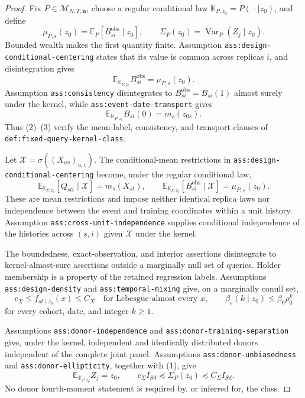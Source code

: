 \documentclass{article}
\begin{document}
\begin{proof}
Fix \(P\in\mathcal M_{N,T,\mathbf n}\), choose a regular conditional law
\(\mathbb K_{P,z_0}=P(\,\cdot\mid z_0)\), and define
\[
 \mu_{P,s}(z_0)=\mathbb E_P[B_{si}^{\mathrm{obs}}\mid z_0],
 \qquad
 \Sigma_P(z_0)=\operatorname{Var}_P(Z_j\mid z_0).           \tag{1}
\]
Bounded wealth makes the first quantity finite.  Assumption
\texttt{ass:design-conditional-centering} states that its value is common across replicas \(i\), and disintegration gives
\[
 \mathbb E_{\mathbb K_{P,z_0}}B_{si}^{\mathrm{obs}}
 =\mu_{P,s}(z_0).                                           \tag{2}
\]
Assumption \texttt{ass:consistency} disintegrates to
\(B_{si}^{\mathrm{obs}}=B_{si}(1)\) almost surely under the kernel, while \texttt{ass:event-date-transport} gives
\[
 \mathbb E_{\mathbb K_{P,z_0}}B_{si}(0)=m_s(z_{0s}).       \tag{3}
\]
Thus (2)--(3) verify the mean-label, consistency, and transport clauses of \texttt{def:fixed-query-kernel-class}.

Let \(\mathcal X=\sigma((X_{uv})_{u,v})\).  The conditional-mean restrictions in \texttt{ass:design-conditional-centering} become, under the regular conditional law,
\[
 \mathbb E_{\mathbb K_{P,z_0}}[Q_{sti}\mid\mathcal X]
 =m_s(X_{st}),
 \qquad
 \mathbb E_{\mathbb K_{P,z_0}}
 [B_{si}^{\mathrm{obs}}\mid\mathcal X]
 =\mu_{P,s}(z_0).                                           \tag{4}
\]
These are mean restrictions and impose neither identical replica laws nor independence between the event and training coordinates within a unit history.  Assumption \texttt{ass:cross-unit-independence} supplies conditional independence of the histories across \((s,i)\) given \(\mathcal X\) under the kernel.

The boundedness, exact-observation, and interior assertions disintegrate to kernel-almost-sure assertions outside a marginally null set of queries.  Holder membership is a property of the retained regression labels.  Assumptions \texttt{ass:design-density} and \texttt{ass:temporal-mixing} give, on a marginally conull set,
\[
 c_X\le f_{st\mid z_0}(x)\le C_X
 \quad\text{for Lebesgue-almost every }x,
 \qquad
 \beta_s(k\mid z_0)\le\beta_0\rho_0^k                    \tag{5}
\]
for every cohort, date, and integer \(k\ge1\).

Assumptions \texttt{ass:donor-independence} and
\texttt{ass:donor-training-separation} give, under the kernel, independent and identically distributed donors independent of the complete joint panel.  Assumptions \texttt{ass:donor-unbiasedness} and \texttt{ass:donor-ellipticity}, together with (1), give
\[
 \mathbb E_{\mathbb K_{P,z_0}}Z_j=z_0,
 \qquad
 c_\Sigma I_{Sd}\preceq\Sigma_P(z_0)
 \preceq C_\Sigma I_{Sd}.                                  \tag{6}
\]
No donor fourth-moment statement is required by, or inferred for, the class.


\end{proof}
\end{document}

